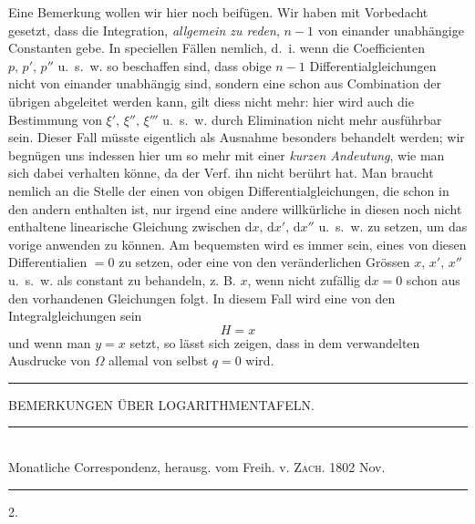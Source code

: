 Eine Bemerkung wollen wir hier noch beifügen. Wir haben mit Vorbedacht gesetzt, dass die Integration, \emph{allgemein zu reden}, \(n-1\) von einander unabhängige Constanten gebe. In speciellen Fällen nemlich, d.\ i. wenn die Coefficienten \(p,\,p',\,p''\) u.\ s.\ w. so beschaffen sind, dass obige \(n-1\) Differentialgleichungen nicht von einander unabhängig sind, sondern eine schon aus Combination der übrigen abgeleitet werden kann, gilt diess nicht mehr: hier wird auch die Bestimmung von \(\xi',\,\xi'',\,\xi'''\) u.\ s.\ w. durch Elimination nicht mehr ausführbar sein. Dieser Fall müsste eigentlich als Ausnahme besonders behandelt werden; wir begnügen uns indessen hier um so mehr mit einer \emph{kurzen Andeutung}, wie man sich dabei verhalten könne, da der Verf. ihn nicht berührt hat. Man braucht nemlich an die Stelle der einen von obigen Differentialgleichungen, die schon in den andern enthalten ist, nur irgend eine andere willkürliche in diesen noch nicht enthaltene linearische Gleichung zwischen \(\mathrm{d}x,\,\mathrm{d}x',\,\mathrm{d}x''\) u.\ s.\ w. zu setzen, um das vorige anwenden zu können. Am bequemsten wird es immer sein, eines von diesen Differentialien \(=0\) zu setzen, oder eine von den veränderlichen Grössen \(x,\,x',\,x''\) u.\ s.\ w.
als constant zu behandeln, z. B. \(x\), wenn nicht zufällig \(\mathrm{d}x=0\) schon aus den
vorhandenen Gleichungen folgt. In diesem Fall wird eine von den Integralgleichungen sein
\[
H=x
\]
und wenn man \(y=x\) setzt, so lässt sich zeigen, dass in dem verwandelten Ausdrucke von \(\Omega\) allemal von selbst \(q=0\) wird.

\begin{center}\rule{0.25\linewidth}{0.3pt}\end{center}

\clearpage
{}
\begin{center}
BEMERKUNGEN ÜBER LOGARITHMENTAFELN.
\end{center}

\begin{center}
\rule{0.65\linewidth}{0.3pt}\\
Monatliche Correspondenz, herausg. vom Freih. v. \textsc{Zach}. 1802 Nov.\\
\rule{0.65\linewidth}{0.3pt}
\end{center}

\begin{center}2.\end{center}

